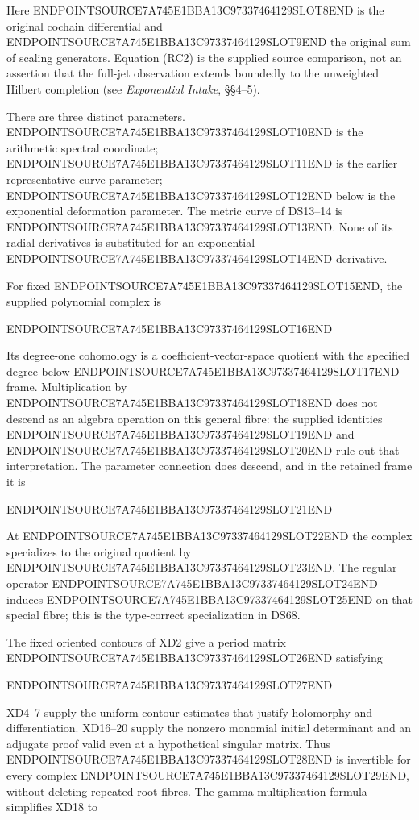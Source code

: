 Here ENDPOINTSOURCE7A745E1BBA13C97337464129SLOT8END is the original cochain differential and ENDPOINTSOURCE7A745E1BBA13C97337464129SLOT9END the original sum of scaling generators. Equation (RC2) is the supplied source comparison, not an assertion that the full-jet observation extends boundedly to the unweighted Hilbert completion (see \emph{Exponential Intake}, §§4--5).

There are three distinct parameters. ENDPOINTSOURCE7A745E1BBA13C97337464129SLOT10END is the arithmetic spectral coordinate; ENDPOINTSOURCE7A745E1BBA13C97337464129SLOT11END is the earlier representative-curve parameter; ENDPOINTSOURCE7A745E1BBA13C97337464129SLOT12END below is the exponential deformation parameter. The metric curve of DS13--14 is ENDPOINTSOURCE7A745E1BBA13C97337464129SLOT13END. None of its radial derivatives is substituted for an exponential ENDPOINTSOURCE7A745E1BBA13C97337464129SLOT14END-derivative.

For fixed ENDPOINTSOURCE7A745E1BBA13C97337464129SLOT15END, the supplied polynomial complex is

ENDPOINTSOURCE7A745E1BBA13C97337464129SLOT16END

Its degree-one cohomology is a coefficient-vector-space quotient with the specified degree-below-ENDPOINTSOURCE7A745E1BBA13C97337464129SLOT17END frame. Multiplication by ENDPOINTSOURCE7A745E1BBA13C97337464129SLOT18END does not descend as an algebra operation on this general fibre: the supplied identities ENDPOINTSOURCE7A745E1BBA13C97337464129SLOT19END and ENDPOINTSOURCE7A745E1BBA13C97337464129SLOT20END rule out that interpretation. The parameter connection does descend, and in the retained frame it is

ENDPOINTSOURCE7A745E1BBA13C97337464129SLOT21END

At ENDPOINTSOURCE7A745E1BBA13C97337464129SLOT22END the complex specializes to the original quotient by ENDPOINTSOURCE7A745E1BBA13C97337464129SLOT23END. The regular operator ENDPOINTSOURCE7A745E1BBA13C97337464129SLOT24END induces ENDPOINTSOURCE7A745E1BBA13C97337464129SLOT25END on that special fibre; this is the type-correct specialization in DS68.

The fixed oriented contours of XD2 give a period matrix ENDPOINTSOURCE7A745E1BBA13C97337464129SLOT26END satisfying

ENDPOINTSOURCE7A745E1BBA13C97337464129SLOT27END

XD4--7 supply the uniform contour estimates that justify holomorphy and differentiation. XD16--20 supply the nonzero monomial initial determinant and an adjugate proof valid even at a hypothetical singular matrix. Thus ENDPOINTSOURCE7A745E1BBA13C97337464129SLOT28END is invertible for every complex ENDPOINTSOURCE7A745E1BBA13C97337464129SLOT29END, without deleting repeated-root fibres. The gamma multiplication formula simplifies XD18 to

